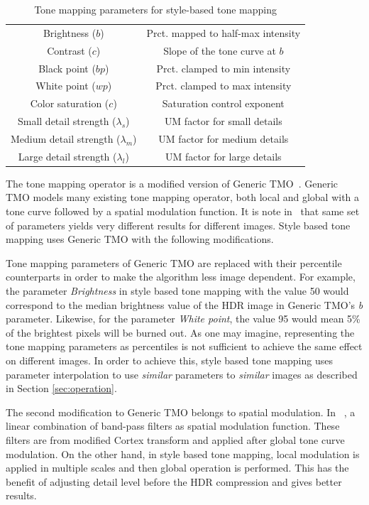 \begin{table}
\caption{Tone mapping parameters for style-based tone mapping}
\label{tab:tonemap_parameters}
\centering
\begin{tabular}{|c|c|}
\hline 
Brightness ($b$) & Prct. mapped to half-max intensity \\
Contrast ($c$) & Slope of the tone curve at $b$ \\
Black point ($bp$) & Prct. clamped to min intensity \\
White point ($wp$) & Prct. clamped to max intensity \\
Color saturation ($c$) & Saturation control exponent \\
\hline
Small detail strength ($\lambda_s$) & UM factor for small details \\
Medium detail strength ($\lambda_m$) & UM factor for medium details \\
Large detail strength ($\lambda_l$) & UM factor for large details \\
\hline
\end{tabular}
\end{table}

The tone mapping operator is a modified version of Generic TMO~\cite{mantiuk2008modeling}. Generic TMO models many existing tone mapping operator, both local and global with a tone curve followed by a spatial modulation function. It is note in~\cite{mantiuk2008modeling} that same set of parameters yields very different results for different images. Style based tone mapping uses Generic TMO with the following modifications.

Tone mapping parameters of Generic TMO are replaced with their percentile counterparts in order to make the algorithm less image dependent. For example, the parameter \emph{Brightness} in style based tone mapping with the value 50 would correspond to the median brightness value of the HDR image in Generic TMO's \emph{b} parameter. Likewise, for the parameter \emph{White point}, the value 95 would mean 5\% of the brightest pixels will be burned out. As one may imagine, representing the tone mapping parameters as percentiles is not sufficient to achieve the same effect on different images. In order to achieve this, style based tone mapping uses parameter interpolation to use \emph{similar} parameters to \emph{similar} images as described in Section \ref{sec:operation}. 

The second modification to Generic TMO belongs to spatial modulation. In ~\cite{mantiuk2008modeling}, a linear combination of band-pass filters as spatial modulation function. These filters are from modified Cortex transform and applied after global tone curve modulation. On the other hand, in style based tone mapping, local modulation is applied in multiple scales and then global operation is performed. This has the benefit of adjusting detail level before the HDR compression and gives better results. 

